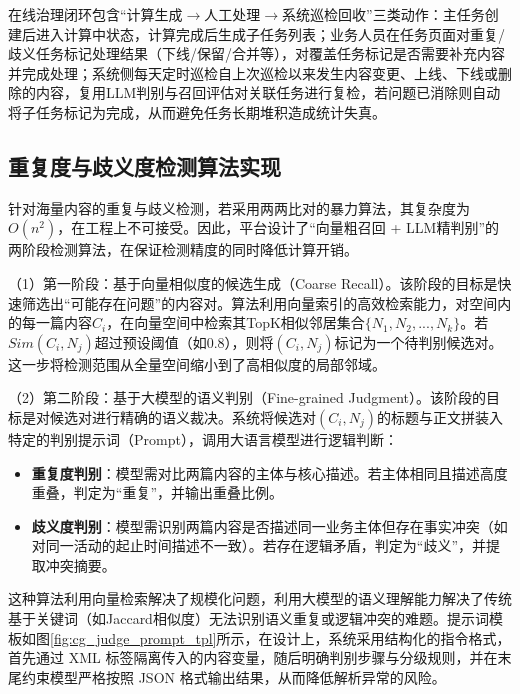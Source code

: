 在线治理闭环包含“计算生成$\rightarrow$人工处理$\rightarrow$系统巡检回收”三类动作：主任务创建后进入计算中状态，计算完成后生成子任务列表；业务人员在任务页面对重复/歧义任务标记处理结果（下线/保留/合并等），对覆盖任务标记是否需要补充内容并完成处理；系统侧每天定时巡检自上次巡检以来发生内容变更、上线、下线或删除的内容，复用LLM判别与召回评估对关联任务进行复检，若问题已消除则自动将子任务标记为完成，从而避免任务长期堆积造成统计失真。

\subsection{重复度与歧义度检测算法实现}
\label{subsec:impl_cg_dup_amb}

针对海量内容的重复与歧义检测，若采用两两比对的暴力算法，其复杂度为$O(n^2)$，在工程上不可接受。因此，平台设计了“向量粗召回 + LLM精判别”的两阶段检测算法，在保证检测精度的同时降低计算开销。

（1）第一阶段：基于向量相似度的候选生成（Coarse Recall）。该阶段的目标是快速筛选出“可能存在问题”的内容对。算法利用向量索引的高效检索能力，对空间内的每一篇内容$C_i$，在向量空间中检索其TopK相似邻居集合$\{N_1, N_2, ..., N_k\}$。若$Sim(C_i, N_j)$超过预设阈值（如0.8），则将$(C_i, N_j)$标记为一个待判别候选对。这一步将检测范围从全量空间缩小到了高相似度的局部邻域。

（2）第二阶段：基于大模型的语义判别（Fine-grained Judgment）。该阶段的目标是对候选对进行精确的语义裁决。系统将候选对$(C_i, N_j)$的标题与正文拼装入特定的判别提示词（Prompt），调用大语言模型进行逻辑判断：
\begin{itemize}
\item \textbf{重复度判别}：模型需对比两篇内容的主体与核心描述。若主体相同且描述高度重叠，判定为“重复”，并输出重叠比例。
\item \textbf{歧义度判别}：模型需识别两篇内容是否描述同一业务主体但存在事实冲突（如对同一活动的起止时间描述不一致）。若存在逻辑矛盾，判定为“歧义”，并提取冲突摘要。
\end{itemize}

这种算法利用向量检索解决了规模化问题，利用大模型的语义理解能力解决了传统基于关键词（如Jaccard相似度）无法识别语义重复或逻辑冲突的难题。提示词模板如图\ref{fig:cg_judge_prompt_tpl}所示，在设计上，系统采用结构化的指令格式，首先通过 XML 标签隔离传入的内容变量，随后明确判别步骤与分级规则，并在末尾约束模型严格按照 JSON 格式输出结果，从而降低解析异常的风险。


